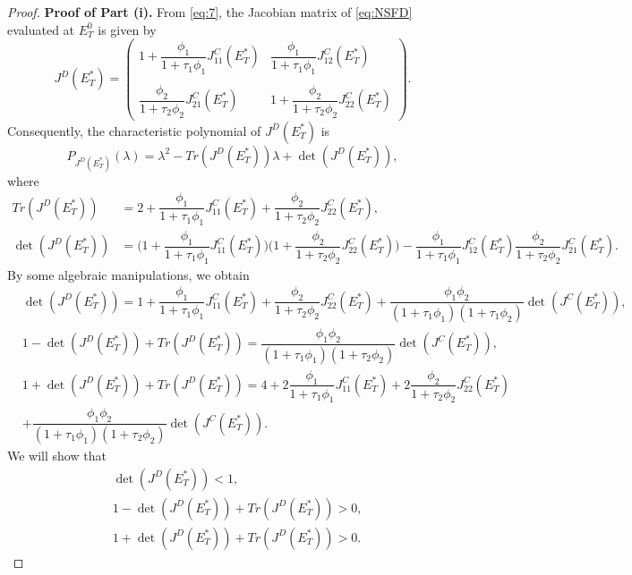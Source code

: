 \documentclass[12pt]{article}
\theoremstyle{definition}
\theoremstyle{remark}
\numberwithin{equation}{section}
\begin{document}
\begin{proof}
\textbf{Proof of Part (i).} From \eqref{eq:7}, the Jacobian matrix of \eqref{eq:NSFD} evaluated at $E_T^0$ is given by
\begin{equation*}\label{eq:11}
J^D(E_T^*) = 
\begin{pmatrix}
1 + \dfrac{\phi_1}{1 + \tau_1\phi_1}J_{11}^C(E_T^*)&\dfrac{\phi_1}{1 + \tau_1\phi_1}J_{12}^C(E_T^*)\\
&\\
\dfrac{\phi_2}{1 + \tau_2\phi_2}J_{21}^C(E_T^*)&1 + \dfrac{\phi_2}{1 + \tau_2\phi_2}J_{22}^C(E_T^*)
\end{pmatrix}.
\end{equation*}
Consequently, the characteristic polynomial of $J^D(E_T^*)$ is
\begin{equation*}
P_{J^D(E_T^*)}(\lambda) = \lambda^2 - Tr(J^D(E_T^*))\lambda + \det(J^D(E_T^*)),
\end{equation*}
where
\begin{equation*}
\begin{split}
Tr(J^D(E_T^*)) &= 2  + \dfrac{\phi_1}{1 + \tau_1\phi_1}J_{11}^C(E_T^*) + \dfrac{\phi_2}{1 + \tau_2\phi_2}J_{22}^C(E_T^*),\\
\det(J^D(E_T^*)) &= \bigg(1 + \dfrac{\phi_1}{1 + \tau_1\phi_1}J_{11}^C(E_T^*)\bigg)\bigg(1 + \dfrac{\phi_2}{1 + \tau_2\phi_2}J_{22}^C(E_T^*)\bigg) - \dfrac{\phi_1}{1 + \tau_1\phi_1}J_{12}^C(E_T^*)\dfrac{\phi_2}{1 + \tau_2\phi_2}J_{21}^C(E_T^*).
\end{split}
\end{equation*}
By some algebraic manipulations, we obtain
\begin{equation}\label{eq:12}
\begin{split}
&\det(J^D(E_T^*)) = 1 + \dfrac{\phi_1}{1 + \tau_1\phi_1}J_{11}^C(E_T^*) + \dfrac{\phi_2}{1 + \tau_2\phi_2}J_{22}^C(E_T^*) + \dfrac{\phi_1\phi_2}{(1 + \tau_1\phi_1)(1 + \tau_1\phi_2)}\det(J^C(E_T^*)),\\
%
%
&1 - \det(J^D(E_T^*)) + Tr(J^D(E_T^*)) = \dfrac{\phi_1\phi_2}{(1 + \tau_1\phi_1)(1 + \tau_2\phi_2)}\det(J^C(E_T^*)),\\
&1 + \det(J^D(E_T^*)) + Tr(J^D(E_T^*)) = 4 + 2\dfrac{\phi_1}{1 + \tau_1\phi_1}J_{11}^C(E_T^*) + 2\dfrac{\phi_2}{1 + \tau_2\phi_2}J_{22}^C(E_T^*)\\
&+ \dfrac{\phi_1\phi_2}{(1 + \tau_1\phi_1)(1 + \tau_2\phi_2)}\det(J^C(E_T^*)).
\end{split}
\end{equation} 
We will show that
\begin{equation}\label{eq:13}
\begin{split}
&\det(J^D(E_T^*)) < 1,\\
%
%
&1 - \det(J^D(E_T^*)) + Tr(J^D(E_T^*))  > 0,\\
%
%
&1 + \det(J^D(E_T^*)) + Tr(J^D(E_T^*)) > 0.
\end{split}
\end{equation}


\end{proof}
\end{document}
